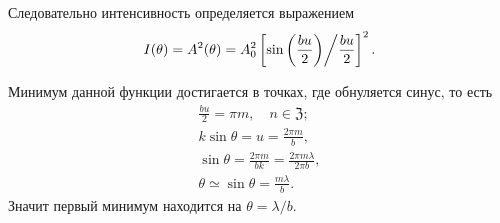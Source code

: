 Следовательно интенсивность определяется выражением
\begin{equation}
	I(\theta) = A^2(\theta) = A_0^2 \left[ \sin \left( \frac{bu}{2}\right) \middle/  \frac{bu}{2} \right]^2.
\end{equation}

Минимум данной функции достигается в точках, где обнуляется синус, то есть
\begin{gather*}
	\frac{bu}{2} = \pi m, \quad n \in \mathfrak Z;\\
	k \sin \theta = u = \frac{2 \pi m}{b},\\
	\sin \theta = \frac{2 \pi m}{bk} = \frac{2 \pi m \lambda}{2 \pi b},\\
	\theta \simeq \sin \theta = \frac{m \lambda}{b}.
\end{gather*}
Значит первый минимум находится на $\theta = \lambda/b$.


